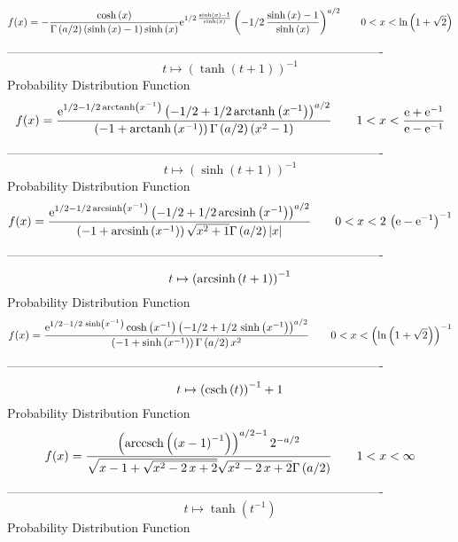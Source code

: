 \documentclass[12pt]{article}
\begin{document}
$$  f(x)=-{\frac {\cosh \left( x \right) }{\Gamma \left( a/2 \right)  \left( 
\sinh \left( x \right) -1 \right) \sinh \left( x \right) }{{\rm e}^{1/
2\,{\frac {\sinh \left( x \right) -1}{\sinh \left( x \right) }}}}
 \left( -1/2\,{\frac {\sinh \left( x \right) -1}{\sinh \left( x
 \right) }} \right) ^{a/2}}
 \qquad0
 < x < \ln  \left( 1+\sqrt {2} \right) 
$$-------------------------------------------------------------------------------------------  \\$$t\mapsto  \left( \tanh \left( t+1 \right)  \right) ^{-1}
$$Probability Distribution Function 
$$  f(x)={\frac {{{\rm e}^{1/2-1/2\,{\rm arctanh} \left({x}^{-1}\right)}}
 \left( -1/2+1/2\,{\rm arctanh} \left({x}^{-1}\right) \right) ^{a/2}}{
 \left( -1+{\rm arctanh} \left({x}^{-1}\right) \right) \Gamma \left( a
/2 \right)  \left( {x}^{2}-1 \right) }}
 \qquad1
 < x < {\frac {{\rm e}+{{\rm e}^{-1}}}{{\rm e}-{{\rm e}^{-1}}}}
$$-------------------------------------------------------------------------------------------  \\$$t\mapsto  \left( \sinh \left( t+1 \right)  \right) ^{-1}
$$Probability Distribution Function 
$$  f(x)={\frac {{{\rm e}^{1/2-1/2\,{\rm arcsinh} \left({x}^{-1}\right)}}
 \left( -1/2+1/2\,{\rm arcsinh} \left({x}^{-1}\right) \right) ^{a/2}}{
 \left( -1+{\rm arcsinh} \left({x}^{-1}\right) \right) \sqrt {{x}^{2}+
1}\Gamma \left( a/2 \right)  \left| x \right| }}
 \qquad0
 < x < 2\, \left( {\rm e}-{{\rm e}^{-1}} \right) ^{-1}
$$-------------------------------------------------------------------------------------------  \\$$t\mapsto  \left( {\rm arcsinh} \left(t+1\right) \right) ^{-1}
$$Probability Distribution Function 
$$  f(x)={\frac {{{\rm e}^{1/2-1/2\,\sinh \left( {x}^{-1} \right) }}\cosh
 \left( {x}^{-1} \right)  \left( -1/2+1/2\,\sinh \left( {x}^{-1}
 \right)  \right) ^{a/2}}{ \left( -1+\sinh \left( {x}^{-1} \right) 
 \right) \Gamma \left( a/2 \right) {x}^{2}}}
 \qquad0
 < x <  \left( \ln  \left( 1+\sqrt {2} \right)  \right) ^{-1}
$$-------------------------------------------------------------------------------------------  \\$$t\mapsto  \left( {\rm csch} \left(t\right) \right) ^{-1}+1
$$Probability Distribution Function 
$$  f(x)={\frac { \left( {\rm arccsch} \left( \left( x-1 \right) ^{-1}\right)
 \right) ^{a/2-1}{2}^{-a/2}}{\sqrt {x-1+\sqrt {{x}^{2}-2\,x+2}}\sqrt {
{x}^{2}-2\,x+2}\Gamma \left( a/2 \right) }}
 \qquad1
 < x < \infty 
$$-------------------------------------------------------------------------------------------  \\$$t\mapsto \tanh \left( {t}^{-1} \right) 
$$Probability Distribution Function 
\end{document}
